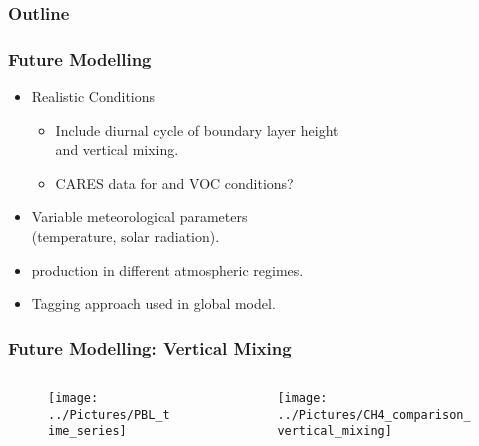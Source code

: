 \begin{frame}
    \frametitle{Outline} 
    \tableofcontents[currentsection]
\end{frame} 

\begin{frame}
    \frametitle{Future Modelling}
    \vspace{-5mm}
    \begin{itemize}
        \item Realistic Conditions
            \begin{itemize}
                \item Include diurnal cycle of boundary layer height \\ and vertical mixing. %
                \item CARES data for  and VOC conditions? \vspace{2mm}
            \end{itemize}
        \item Variable meteorological parameters \\ (temperature, solar radiation). \vspace{2mm}
        \item {} production in different atmospheric regimes. \vspace{2mm}
        \item Tagging approach used in global model. \vspace{2mm}
    \end{itemize}
\end{frame}

\begin{frame}
    \frametitle{Future Modelling: Vertical Mixing}

    \vspace{-5mm}
    \begin{columns}[onlytextwidth]
        \begin{column}{0.5\textwidth}
            \begin{figure}
                \centering
                \texttt{[image: ../Pictures/PBL\_time\_series]}
            \end{figure}
        \end{column}%
        \begin{column}{0.5\textwidth} 
            \begin{figure}
                \centering
                \texttt{[image: ../Pictures/CH4\_comparison\_vertical\_mixing]}
            \end{figure}
        \end{column}
    \end{columns}
\end{frame} 

